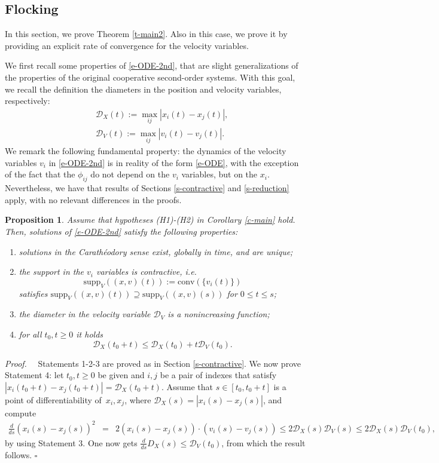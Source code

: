 \documentclass[journal]{article}
\newtheorem{proposition}[lemma]{Proposition}
\newenvironment{proof}{{\it Proof.}~~}{\hfill$\square$}
\newcommand{\D}{\mathcal{D}}
\begin{document}
\subsection{Flocking}
In this section, we prove Theorem \ref{t-main2}. Also in this case, we prove it by providing an explicit rate of convergence for the velocity variables.

We first recall some properties of \eqref{e-ODE-2nd}, that are slight generalizations of the properties of the original cooperative second-order systems. With this goal, we recall the definition the diameters in the position and velocity variables, respectively:
\begin{eqnarray}
&&\D_X(t):=\max_{ij}|x_i(t)-x_j(t)|,\label{e-DX}\\
&&\D_V(t):=\max_{ij}|v_i(t)-v_j(t)|.\label{e-DV}
\end{eqnarray}
We remark the following fundamental property: the dynamics of the velocity variables $v_i$ in \eqref{e-ODE-2nd} is in reality of the form \eqref{e-ODE}, with the exception of the fact that the $\phi_{ij}$ do not depend on the $v_i$ variables, but on the $x_i$. Nevertheless, we have that results of Sections \ref{s-contractive} and \ref{s-reduction} apply, with no relevant differences in the proofs.

\begin{proposition} \label{p-2nd} Assume that hypotheses (H1)-(H2) in Corollary \ref{c-main} hold. Then, solutions of \eqref{e-ODE-2nd} satisfy the following properties:
\begin{enumerate}
\item solutions in the Carathéodory sense exist, globally in time, and are unique;
\item the support in the $v_i$ variables is contractive, i.e. 
$$\mathrm{supp}_V((x,v)(t)):=\mathrm{conv}(\{v_i(t)\})$$
satisfies $\mathrm{supp}_V((x,v)(t))\supseteq \mathrm{supp}_V((x,v)(s))$ for $0\leq t\leq s$;
\item the diameter in the velocity variable $\D_V$ is a nonincreasing function;
\item for all $t_0,t\geq 0$ it holds
\begin{equation}\label{e-DX-dyn}
\D_X(t_0+t)\leq \D_X(t_0)+t\D_V(t_0).
\end{equation}
\end{enumerate}
\end{proposition}
\begin{proof} Statements 1-2-3 are proved as in Section \ref{s-contractive}. We now prove Statement 4: let $t_0,t\geq 0$ be given and $i,j$ be a pair of indexes that satisfy $|x_i(t_0+t)-x_j(t_0+t)|=\D_X(t_0+t)$. Assume that $s\in[t_0,t_0+t]$ is a point of differentiability of~$x_i, x_j$, where $\D_X(s)=|x_i(s)-x_j(s)|$, and compute
\begin{eqnarray*}
\frac{d}{ds} (x_i(s)- x_j(s))^2&=&2 (x_i(s)-x_j(s))\cdot (v_i(s)-v_j(s))\leq 2\D_X(s)\D_V(s)\leq 2\D_X(s)\D_V(t_0),
\end{eqnarray*}
by using Statement 3. One now gets $\frac{d}{ds} D_X(s)\leq \D_V(t_0)$, from which the result follows.
\end{proof}
\end{document}

